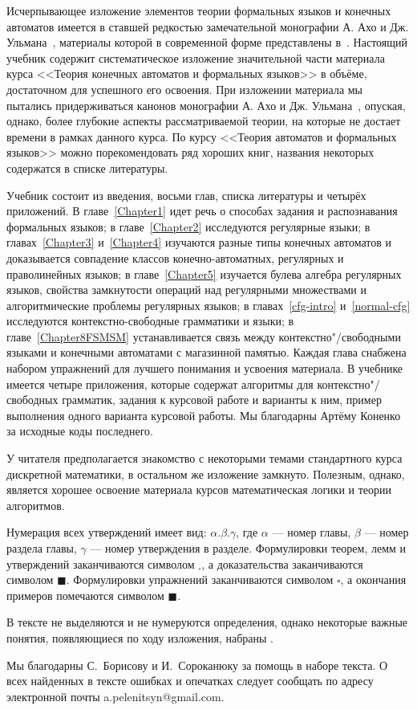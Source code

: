 Исчерпывающее изложение элементов теории формальных языков и конечных автоматов имеется в ставшей редкостью замечательной монографии А. Ахо и Дж. Ульмана~\cite{AU}, материалы которой в современной форме представлены в~\cite{Hop}. Настоящий учебник содержит систематическое изложение значительной части материала курса <<Теория конечных автоматов и формальных языков>> в объёме, достаточном для успешного его освоения. При изложении материала мы пытались придерживаться канонов монографии А. Ахо и Дж. Ульмана~\cite{AU}, опуская, однако, более глубокие аспекты рассматриваемой теории, на которые не достает времени в рамках данного курса. По курсу <<Теория автоматов и формальных языков>> можно порекомендовать ряд хороших книг, названия некоторых содержатся в списке литературы. 

Учебник состоит из введения, восьми глав, списка литературы и четырёх приложений. В главе~\ref{Chapter1} идет речь о способах задания и распознавания формальных языков; в главе~\ref{Chapter2} исследуются регулярные языки; в главах~\ref{Chapter3} и~\ref{Chapter4} изучаются разные типы конечных автоматов и доказывается совпадение классов конечно-автоматных, регулярных и праволинейных языков; в главе~\ref{Chapter5} изучается булева алгебра регулярных языков, свойства замкнутости операций над регулярными множествами и алгоритмические проблемы регулярных языков; в главах~\ref{cfg-intro} и~\ref{normal-cfg} исследуются контекстно-свободные грамматики и языки; в главе~\ref{Chapter8FSMSM} устанавливается связь между контекстно"/свободными языками и конечными автоматами с магазинной памятью. Каждая глава снабжена набором упражнений для лучшего понимания и усвоения материала. В учебнике имеется четыре приложения, которые содержат алгоритмы для контекстно"/свободных грамматик, задания к курсовой работе и варианты к ним, пример выполнения одного варианта курсовой работы. Мы благодарны Артёму Коненко за исходные коды последнего.

У читателя предполагается знакомство с некоторыми темами стандартного курса дискретной математики, в остальном же изложение замкнуто. Полезным, однако, является хорошее освоение материала курсов математическая логики и теории алгоритмов.

Нумерация всех утверждений имеет вид: $\alpha.\beta.\gamma$, где $\alpha$ --- номер главы, $\beta$ --- номер раздела главы, $\gamma$ --- номер утверждения в разделе. Формулировки теорем, лемм и утверждений заканчиваются символом $_\square$, а доказательства заканчиваются символом $\blacksquare$. Формулировки упражнений заканчиваются символом $\square$, а окончания примеров помечаются символом $\blacksquare$.

В тексте не выделяются и не нумеруются определения, однако некоторые важные понятия, появляющиеся по ходу изложения, набраны .

Мы благодарны С.~Борисову и И.~Сороканюку за помощь в наборе текста. О всех найденных в тексте ошибках и опечатках следует сообщать по адресу электронной почты a.pelenitsyn@gmail.com.
